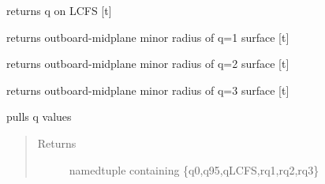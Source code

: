 \documentclass[letterpaper,10pt,english]{sphinxmanual}
\begin{document}
\begin{fulllineitems}
\begin{fulllineitems}
\end{fulllineitems}


\begin{fulllineitems}
\label{eqtools:eqtools.EFIT.EFITTree.getQLCFS}
returns q on LCFS {[}t{]}

\end{fulllineitems}


\begin{fulllineitems}
\label{eqtools:eqtools.EFIT.EFITTree.getQ1Surf}
returns outboard-midplane minor radius of q=1 surface {[}t{]}

\end{fulllineitems}


\begin{fulllineitems}
\label{eqtools:eqtools.EFIT.EFITTree.getQ2Surf}
returns outboard-midplane minor radius of q=2 surface {[}t{]}

\end{fulllineitems}


\begin{fulllineitems}
\label{eqtools:eqtools.EFIT.EFITTree.getQ3Surf}
returns outboard-midplane minor radius of q=3 surface {[}t{]}

\end{fulllineitems}


\begin{fulllineitems}
\label{eqtools:eqtools.EFIT.EFITTree.getQs}
pulls q values
\begin{quote}\begin{description}
\item[{Returns}] \leavevmode
namedtuple containing \{q0,q95,qLCFS,rq1,rq2,rq3\}

\end{description}\end{quote}


\end{fulllineitems}
\end{fulllineitems}
\end{document}
